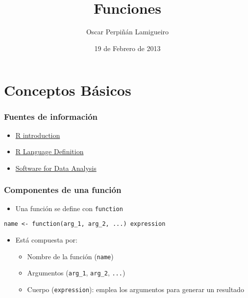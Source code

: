 \documentclass[xcolor={usenames,svgnames,dvipsnames}]{beamer}
\title{Funciones}
\author{Oscar Perpiñán Lamigueiro}
\date{19 de Febrero de 2013}
\begin{document}
\maketitle




\section{Conceptos Básicos}
\label{sec-1}
\begin{frame}
\frametitle{Fuentes de información}
\label{sec-1-1}

\begin{itemize}
\item \href{http://cran.r-project.org/doc/manuals/R-intro.html}{R introduction}
\item \href{http://cran.r-project.org/doc/manuals/R-lang.html}{R Language Definition}
\item \href{http://books.google.es/books/about/Software_for_Data_Analysis.html}{Software for Data Analysis}
\end{itemize}
\end{frame}
\begin{frame}
\frametitle{Componentes de una función}
\label{sec-1-2}

\begin{itemize}
\item Una función se define con \texttt{function}
\end{itemize}
\begin{center}
\texttt{name <- function(arg\_1, arg\_2, ...) expression}
\end{center}

\begin{itemize}
\item Está compuesta por:
\begin{itemize}
\item Nombre de la función (\texttt{name})
\item Argumentos (\texttt{arg\_1}, \texttt{arg\_2}, \texttt{...})
\item Cuerpo (\texttt{expression}): emplea los argumentos para generar un resultado
\end{itemize}
\end{itemize}
\end{frame}
\end{document}
